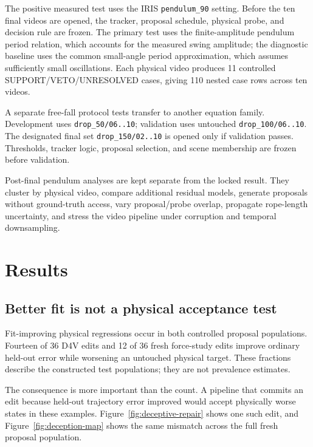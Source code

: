 \documentclass[acmtog]{acmart}
\begin{document}
The positive measured test uses the IRIS \texttt{pendulum\_90} setting. Before the ten final videos are opened, the tracker, proposal schedule, physical probe, and decision rule are frozen. The primary test uses the finite-amplitude pendulum period relation, which accounts for the measured swing amplitude; the diagnostic baseline uses the common small-angle period approximation, which assumes sufficiently small oscillations. Each physical video produces 11 controlled SUPPORT/VETO/UNRESOLVED cases, giving 110 nested case rows across ten videos.

A separate free-fall protocol tests transfer to another equation family. Development uses \texttt{drop\_50/06..10}; validation uses untouched \texttt{drop\_100/06..10}. The designated final set \texttt{drop\_150/02..10} is opened only if validation passes. Thresholds, tracker logic, proposal selection, and scene membership are frozen before validation.

Post-final pendulum analyses are kept separate from the locked result. They cluster by physical video, compare additional residual models, generate proposals without ground-truth access, vary proposal/probe overlap, propagate rope-length uncertainty, and stress the video pipeline under corruption and temporal downsampling.

\section{Results}\label{results-and-analysis}

\subsection{Better fit is not a physical acceptance test}\label{deceptive-repair-is-a-distinct-failure-mode}

Fit-improving physical regressions occur in both controlled proposal populations. Fourteen of 36 D4V edits and 12 of 36 fresh force-study edits improve ordinary held-out error while worsening an untouched physical target. These fractions describe the constructed test populations; they are not prevalence estimates.

The consequence is more important than the count. A pipeline that commits an edit because held-out trajectory error improved would accept physically worse states in these examples. Figure~\ref{fig:deceptive-repair} shows one such edit, and Figure~\ref{fig:deception-map} shows the same mismatch across the full fresh proposal population.
\end{document}
